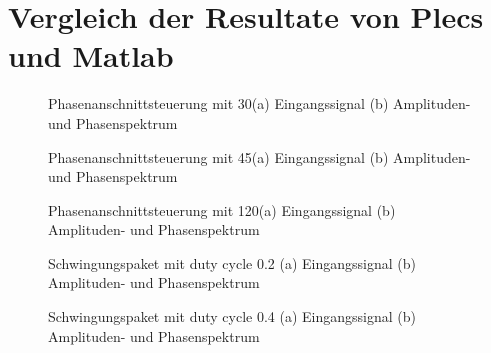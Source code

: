 \begin{appendix}
\begin{lstlisting}[language=Arduino]
\end{lstlisting}

\newpage
\section{Vergleich der Resultate von Plecs und Matlab}

\begin{figure}[ht!]
	\centering
	\qquad
	\caption{Phasenanschnittsteuerung mit 30\textdegree (a) Eingangssignal (b) Amplituden- und Phasenspektrum}
	\label{fig:Phasenanschnittsteuerung_mit_30}
\end{figure}

\begin{figure}[ht!]
	\centering
	\qquad
	\caption{Phasenanschnittsteuerung mit 45\textdegree (a) Eingangssignal (b) Amplituden- und Phasenspektrum}
	\label{fig:Phasenanschnittsteuerung_mit_45}
\end{figure}

\begin{figure}[ht!]
	\centering
	\qquad
	\caption{Phasenanschnittsteuerung mit 120\textdegree (a) Eingangssignal (b) Amplituden- und Phasenspektrum}
	\label{fig:Phasenanschnittsteuerung_mit_120}
\end{figure}

\newpage

\begin{figure}[ht!]
	\centering
	\qquad
	\caption{Schwingungspaket mit duty cycle 0.2 (a) Eingangssignal (b) Amplituden- und Phasenspektrum}
	\label{fig:Schwingungspaketsteuerung_mit_duty_cycle_0_2}
\end{figure}


\begin{figure}[ht!]
	\centering
	\qquad
	\caption{Schwingungspaket mit duty cycle 0.4 (a) Eingangssignal (b) Amplituden- und Phasenspektrum}
	\label{fig:Schwingungspaketsteuerung_mit_duty_cycle_0_4}
\end{figure}


\end{appendix}
